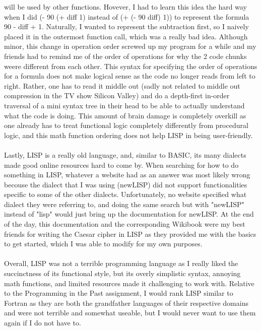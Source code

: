 \documentclass[letterpaper, 10pt, DIV=13]{scrartcl}
\numberwithin{equation}{section}
\numberwithin{figure}{section}
\numberwithin{table}{section}
\begin{document}
will be used by other functions. Hovever, I had to learn this idea the hard way when I did (- 90 (+ diff 1) instead of (+ (- 90 diff) 1)) to represent the formula
90 - diff + 1. Naturally, I wanted to represent the subtraction first, so I naively placed it in the outermost function call, which was a really bad idea.
Although minor, this change in operation order screwed up my program for a while and my friends had to remind me of the order of operations for why the 2 
code chunks weere different from each other. This syntax for specifying the order of operations for a formula does not make logical sense as the code no 
longer reads from left to right. Rather, one has to read it middle out (sadly not related to middle out compression in the TV show Silicon Valley) and do a depth-first
in-order traversal of a mini syntax tree in their head to be able to actually understand what the code is doing. This amount of brain damage is completely overkill as
one already has to treat functional logic completely differently from procedural logic, and this math function ordering does not help LISP in being user-friendly.
\\ \\
Lastly, LISP is a really old language, and, similar to BASIC, its many dialects made good online resources hard to come by. When searching for how to do something in LISP, 
whatever a website had as an answer was most likely wrong becouse the dialect that I was using (newLISP) did not support functionalities specific to some of the 
other dialects. Unfortunately, no website specified what dialect they were referring to, and doing the same search but with "newLISP" instead of "lisp" would 
just bring up the documentation for newLISP. At the end of the day, this documentation and the corresponding Wikibook were my best friends for writing the Caesar cipher
in LISP as they provided me with the basics to get started, which I was able to modify for my own purposes.
\\ \\
Overall, LISP was not a terrible programming language as I really liked the succinctness of its functional style, but its overly simplistic syntax, annoying math 
functions, and limited resources made it challenging to work with. Relative to the Programming in the Past assignment, I would rank LISP similar to Fortran as they are 
both the grandfather languages of their respective domains and were not terrible and somewhat useable, but I would never want to use them again if I do not have to.
\end{document}
